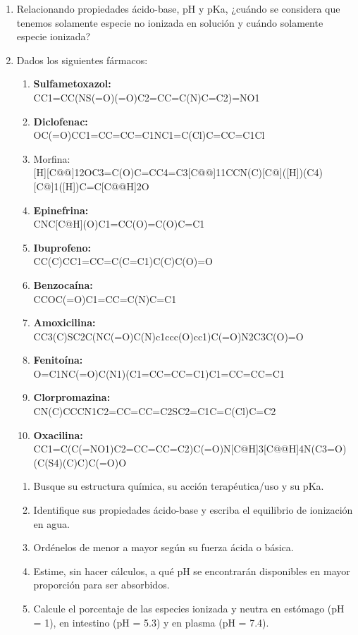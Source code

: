 \documentclass[12pt,a4paper]{article}
\begin{document}
\begin{enumerate}
	\item Relacionando propiedades ácido-base, pH y pKa, ¿cuándo se considera que tenemos solamente especie no ionizada en solución y cuándo solamente especie ionizada?
	
	\item Dados los siguientes fármacos:
	
		\begin{enumerate}
			\centering
			\item \textbf{Sulfametoxazol:} \\ {\small CC1=CC(NS(=O)(=O)C2=CC=C(N)C=C2)=NO1}
			\item \textbf{Diclofenac:} \\ {\small OC(=O)CC1=CC=CC=C1NC1=C(Cl)C=CC=C1Cl}
			\item Morfina: \\ {\small [H][C@@]12OC3=C(O)C=CC4=C3[C@@]11CCN(C)[C@]\newline([H])(C4)[C@]1([H])C=C[C@@H]2O}
			\item \textbf{Epinefrina:} \\ {\small CNC[C@H](O)C1=CC(O)=C(O)C=C1}
			\item \textbf{Ibuprofeno:} \\ {\small CC(C)CC1=CC=C(C=C1)C(C)C(O)=O}
			\item \textbf{Benzocaína:} \\ {\small CCOC(=O)C1=CC=C(N)C=C1}
			\item \textbf{Amoxicilina:} \\ {\small CC3(C)SC2C(NC(=O)C(N)c1ccc(O)cc1)C(=O)N2C3C(O)=O}
			\item \textbf{Fenitoína:} \\ {\small O=C1NC(=O)C(N1)(C1=CC=CC=C1)C1=CC=CC=C1}
			\item \textbf{Clorpromazina:} \\ {\small CN(C)CCCN1C2=CC=CC=C2SC2=C1C=C(Cl)C=C2}
			\item \textbf{Oxacilina:} \\ {\small CC1=C(C(=NO1)C2=CC=CC=C2)C(=O)N[C@H]3[C@@H]4N(C3=O) \newline [C@H](C(S4)(C)C)C(=O)O}
		\end{enumerate}


		\begin{enumerate}
			\item Busque su estructura química, su acción terapéutica/uso y su pKa.
			\item Identifique sus propiedades ácido-base y escriba el equilibrio de ionización en agua.
			\item Ordénelos de menor a mayor según su fuerza ácida o básica.
			\item Estime, sin hacer cálculos, a qué pH se encontrarán disponibles en mayor proporción para ser absorbidos.
			\item Calcule el porcentaje de las especies ionizada y neutra en estómago (pH = 1), en intestino (pH = 5.3) y en plasma (pH = 7.4).
		\end{enumerate}

	\end{enumerate}
\end{document}
